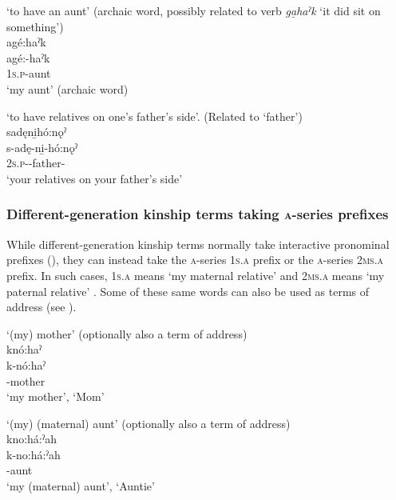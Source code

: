 \newpage
\ea\label{ex:kintermppex15}  ‘to have an aunt’ (archaic word, possibly related to verb \textit{ga̱haˀk} ‘it did sit on something’)\\
agé:haˀk\\
\gll agé:-haˀk\\
\textsc{1s.p}-aunt\\
\glt ‘my aunt’ (archaic word)
\z


\ea\label{ex:kintermppex11}
 ‘to have relatives on one’s father’s side’. (Related to  ‘father’)\\
sadęni̱hó:nǫˀ\\
\gll s-adę-ni̱-hó:nǫˀ\\
\textsc{2s.p}-{\semireflexive}-father-{\populative}\\
\glt ‘your relatives on your father’s side’
\z


\subsubsection*{Different-generation kinship terms taking \textsc{a}-series prefixes} \label{ch:Different-generation kinship terms taking a series prefixes}
While different-generation kinship terms normally take interactive pronominal prefixes (), they can instead take the \textsc{a}-series  \textsc{1s.a} prefix or the \textsc{a}-series  \textsc{2ms.a} prefix. In such cases,  \textsc{1s.a} means ‘my maternal relative’  and  \textsc{2ms.a} means ‘my paternal relative’ . Some of these same words can also be used as terms of address (see ).

\ea\label{ex:interkintermppex15}  ‘(my) mother’ (optionally also a term of address)\\
knó:haˀ \\
\gll k-nó:haˀ\\
 -mother\\
\glt ‘my mother’, `Mom'
\z


\ea\label{ex:interkintermppex18}  ‘(my) (maternal) aunt’ (optionally also a term of address)\\
kno:há:ˀah \\
\gll k-no:há:ˀah\\
 -aunt\\
\glt ‘my (maternal) aunt’, `Auntie'
\z


